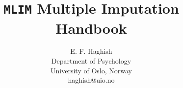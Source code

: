 \documentclass{ol-softwaremanual}
\title{\vspace{30} \texttt{MLIM} Multiple Imputation Handbook}
\author{E. F. Haghish\\ \small{Department of Psychology\\University of Oslo, Norway \\ haghish@uio.no}\linebreak}
\begin{document}
\maketitle

\tableofcontents
\listoflistings
\newpage












%


%
\end{document}
